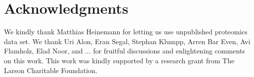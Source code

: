 \section{Acknowledgments}
We kindly thank Matthias Heinemann for letting us use unpublished proteomics data set.
We thank Uri Alon,  Eran Segal, Stephan Klumpp, Arren Bar Even, Avi Flamholz, Elad Noor, and ... for fruitful discussions and enlightening comments on this work.
This work was kindly supported by a research grant from The Larson Charitable Foundation.